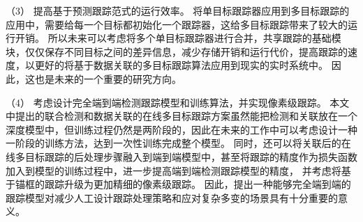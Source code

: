 （3）
提高基于预测跟踪范式的运行效率。
将单目标跟踪器应用到多目标跟踪的应用中，需要给每一个目标都初始化一个跟踪器，这给多目标跟踪带来了较大的运行开销。
所以未来可以考虑将多个单目标跟踪器进行合并，共享跟踪的基础模块，仅仅保存不同目标之间的差异信息，减少存储开销和运行代价，提高跟踪的速度，以更好的将基于数据关联的多目标跟踪算法应用到现实的实时系统中。
因此，这也是未来的一个重要的研究方向。

（4）
考虑设计完全端到端检测跟踪模型和训练算法，并实现像素级跟踪。
本文中提出的联合检测和数据关联的在线多目标跟踪方案虽然能把检测和关联放在一个深度模型中，但训练过程仍然是两阶段的，因此在未来的工作中可以考虑设计一种一阶段的训练方法，达到一次性训练完成整个模型。
同时，还可以将关联后的在线多目标跟踪的后处理步骤融入到端到端模型中，甚至将跟踪的精度作为损失函数加入到模型的训练过程中，进一步提高端到端检测跟踪模型的精度，
并考虑将基于锚框的跟踪升级为更加精细的像素级跟踪。
因此，提出一种能够完全端到端的跟踪模型对减少人工设计跟踪处理策略和应对复杂多变的场景具有十分重要的意义。



